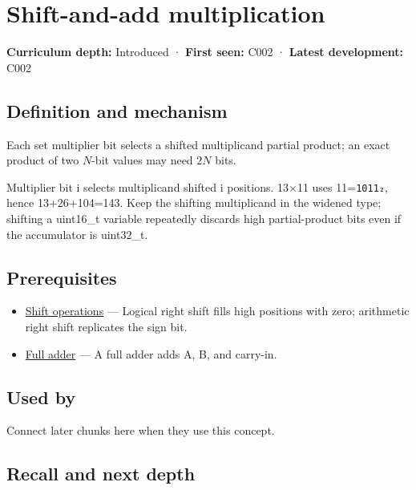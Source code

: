 \hypertarget{appendix-a65290d66ed9}{}
\section{Shift-and-add multiplication}\label{appendix-a65290d66ed9-shift-and-add-multiplication}

\textbf{Curriculum depth:} Introduced · \textbf{First seen:} C002 · \textbf{Latest development:} C002

\subsection{Definition and mechanism}\label{appendix-a65290d66ed9-definition-and-mechanism}

Each set multiplier bit selects a shifted multiplicand partial product; an exact product of two \(N\)-bit values may need \(2N\) bits.

Multiplier bit i selects multiplicand shifted i positions. 13×11 uses 11=\texttt{1011₂}, hence 13+26+104=143. Keep the shifting multiplicand in the widened type; shifting a uint16\_t variable repeatedly discards high partial-product bits even if the accumulator is uint32\_t.

\subsection{Prerequisites}\label{appendix-a65290d66ed9-prerequisites}

\begin{itemize}
\tightlist
\item
  \hyperref[appendix-73425b25118e]{Shift operations} --- Logical right shift fills high positions with zero; arithmetic right shift replicates the sign bit.
\item
  \hyperref[appendix-d1a5b1e520c2]{Full adder} --- A full adder adds A, B, and carry-in.
\end{itemize}

\subsection{Used by}\label{appendix-a65290d66ed9-used-by}

Connect later chunks here when they use this concept.

\subsection{Recall and next depth}\label{appendix-a65290d66ed9-recall-and-next-depth}

